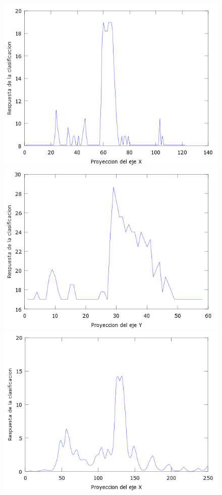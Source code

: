 \begin{figure}[htc]
  \centering
  \includegraphics[scale=.4]{images/plots/boost6X}
  \includegraphics[scale=.4]{images/plots/boost6Y}
  \includegraphics[scale=.4]{images/plots/svm6X}

\end{figure}
